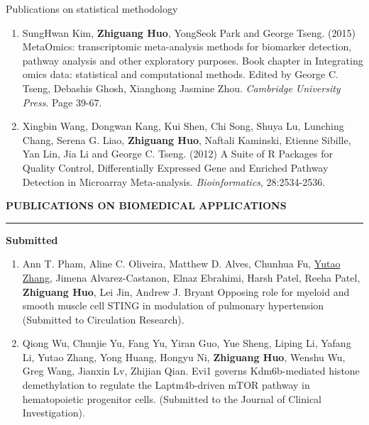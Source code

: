 \documentclass{resume} %
\begin{document}
\begin{rSection}{Publications on statistical methodology}
\begin{enumerate}[noitemsep,topsep=0pt,resume]
\label{genstat_3} 

\item SungHwan Kim,  {\bf Zhiguang Huo}, YongSeok Park and George Tseng.  (2015) MetaOmics: transcriptomic meta-analysis methods for biomarker detection, pathway analysis and other exploratory purposes. Book chapter in Integrating omics data: statistical and computational methods. Edited by George C. Tseng, Debashis Ghosh, Xianghong Jasmine Zhou. \emph{Cambridge University Press}. Page 39-67.

\label{mlmethod_1}
\label{genstat_2} 


\item Xingbin Wang, Dongwan Kang, Kui Shen, Chi Song, Shuya Lu, Lunching Chang, Serena G. Liao, {\bf Zhiguang Huo}, Naftali Kaminski, Etienne Sibille, Yan Lin, Jia Li and George C. Tseng. (2012) A Suite of R Packages for Quality Control, Differentially Expressed Gene and Enriched Pathway Detection in Microarray Meta-analysis. \emph{Bioinformatics}, 28:2534-2536.

\label{soft_1} 
\label{genstat_1} 


\end{enumerate}




\sectionskip
\MakeUppercase{\bf Publications on biomedical applications} %
\sectionlineskip
\hrule %
  


\textbf{Submitted}
\begin{enumerate}[noitemsep,topsep=0pt,resume]

\item 
Ann T. Pham, Aline C. Oliveira, Matthew D. Alves, Chunhua Fu, \underline{Yutao Zhang}, Jimena Alvarez-Castanon, Elnaz Ebrahimi, Harsh Patel, Reeha Patel,  {\bf Zhiguang Huo}, Lei Jin, Andrew J. Bryant
Opposing role for myeloid and smooth muscle cell STING in modulation of pulmonary hypertension
(Submitted to Circulation Research).





\item 
Qiong Wu, Chunjie Yu, Fang Yu, Yiran Guo, Yue Sheng, Liping Li, Yafang Li, Yutao Zhang, Yong Huang, Hongyu Ni, {\bf Zhiguang Huo}, Wenshu Wu, Greg Wang, Jianxin Lv, Zhijian Qian.
Evi1 governs Kdm6b-mediated histone demethylation to regulate the Laptm4b-driven mTOR pathway in hematopoietic progenitor cells.
(Submitted to the Journal of Clinical Investigation).



\end{enumerate}
\end{rSection}
\end{document}
